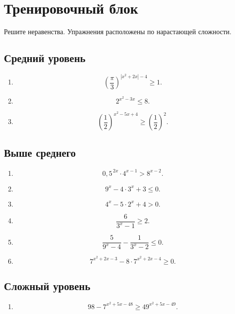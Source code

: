 \documentclass[a4paper,12pt]{article}
\newcommand{\sectionline}{\vspace{2mm}{\color{accent}\hrule height 0.6pt}\vspace{2mm}}
\begin{document}
\newpage

\section*{Тренировочный блок}
\sectionline

Решите неравенства. Упражнения расположены по нарастающей сложности.

\subsection*{Средний уровень}

\begin{enumerate}
    \item
    \[
    \left(\frac{\pi}{3}\right)^{|x^2+2x|-4}\ge 1.
    \]

    \item
    \[
    2^{x^2-3x}\le 8.
    \]

    \item
    \[
    \left(\frac12\right)^{x^2-5x+4}\ge \left(\frac12\right)^2.
    \]
\end{enumerate}

\subsection*{Выше среднего}

\begin{enumerate}[resume]
    \item
    \[
    0{,}5^{\,2x}\cdot 4^{x-1}>8^{x-2}.
    \]

    \item
    \[
    9^x-4\cdot 3^x+3\le 0.
    \]

    \item
    \[
    4^x-5\cdot 2^x+4>0.
    \]

    \item
    \[
    \frac{6}{3^x-1}\ge 2.
    \]

    \item
    \[
    \frac{5}{9^x-4}-\frac{1}{3^x-2}\le 0.
    \]

    \item
    \[
    7^{x^2+2x-3}-8\cdot 7^{x^2+2x-4}\ge 0.
    \]
\end{enumerate}

\subsection*{Сложный уровень}

\begin{enumerate}[resume]
    \item
    \[
    98-7^{x^2+5x-48}\ge 49^{x^2+5x-49}.
    \]
\end{enumerate}
\end{document}
